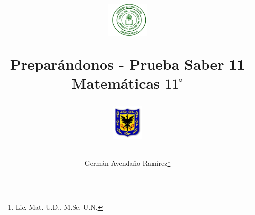 \documentclass[10pt,addpoints]{exam}
\begin{document}
\title{\begin{minipage}{.2\textwidth}
        \includegraphics[height=1.75cm]{Images/logo-colegio.png}
       \end{minipage}
\begin{minipage}{.55\textwidth}
 \begin{center}
Prepar\'andonos - Prueba Saber 11 \\Matem\'aticas $11^{\circ}$
\end{center}
\end{minipage}
\begin{minipage}{.2\textwidth}
\includegraphics[height=1.75cm]{Images/logo-sed.png} 
\end{minipage}
}
\author{Germ\'{a}n Avendaño Ram\'{i}rez\thanks{Lic. Mat. U.D., M.Sc. U.N.}}
\date{}
\maketitle
\begin{center}
\end{center}
\vspace{0.1in}
\end{document}
